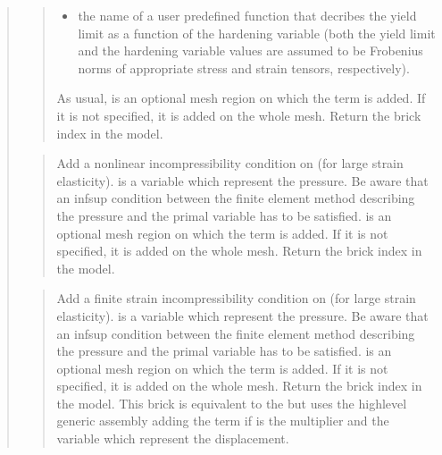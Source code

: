 \documentclass[a4paper,11pt,english]{sphinxmanual}
\begin{document}
\begin{quote}
\begin{quote}
\begin{itemize}
\item {} 
the name of a user predefined function that decribes
the yield limit as a function of the hardening variable
(both the yield limit and the hardening variable values are
assumed to be Frobenius norms of appropriate stress and strain
tensors, respectively).

\end{itemize}

As usual,  is an optional mesh region on which the term is added.
If it is not specified, it is added on the whole mesh.
Return the brick index in the model.
\end{quote}

\begin{quote}

Add a nonlinear incompressibility condition on  (for large
strain elasticity). 
is a variable which represent the pressure. Be aware that an inf\sphinxhyphen{}sup
condition between the finite element method describing the pressure and the
primal variable has to be satisfied.  is an optional mesh region on
which the term is added. If it is not specified, it is added on the
whole mesh. Return the brick index in the model.
\end{quote}

\begin{quote}

Add a finite strain incompressibility condition on  (for large
strain elasticity). 
is a variable which represent the pressure. Be aware that an inf\sphinxhyphen{}sup
condition between the finite element method describing the pressure and the
primal variable has to be satisfied.  is an optional mesh region on
which the term is added. If it is not specified, it is added on the
whole mesh. Return the brick index in the model.
This brick is equivalent to the  but
uses the high\sphinxhyphen{}level generic assembly adding the term
 if  is the multiplier and
 the variable which represent the displacement.
\end{quote}


\end{quote}
\end{document}
